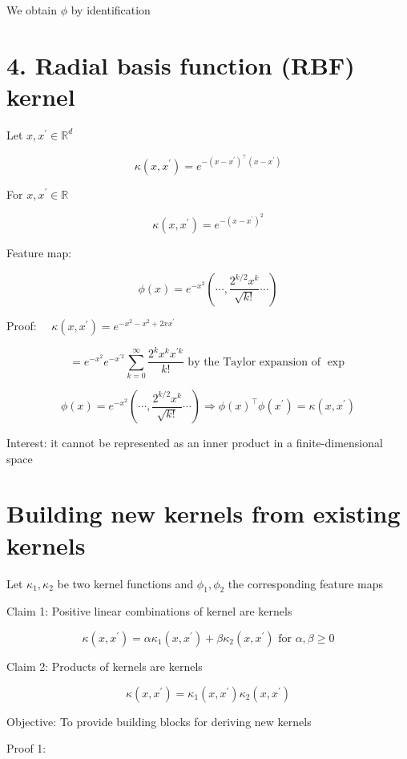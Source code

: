\documentclass[10pt]{article}
\begin{document}
We obtain $\phi$ by identification

\section*{4. Radial basis function (RBF) kernel}
Let $x, x^{\prime} \in \mathbb{R}^{d}$

$$
\kappa\left(x, x^{\prime}\right)=e^{-\left(x-x^{\prime}\right)^{\top}\left(x-x^{\prime}\right)}
$$

For $x, x^{\prime} \in \mathbb{R}$

$$
\kappa\left(x, x^{\prime}\right)=e^{-\left(x-x^{\prime}\right)^{2}}
$$

Feature map:

$$
\phi(x)=e^{-x^{2}}\left(\cdots, \frac{2^{k / 2} x^{k}}{\sqrt{k !}} \cdots\right)
$$

Proof: $\quad \kappa\left(x, x^{\prime}\right)=e^{-x^{2}-x^{2}+2 x x^{\prime}}$

$$
=e^{-x^{2}} e^{-x^{\prime 2}} \sum_{k=0}^{\infty} \frac{2^{k} x^{k} x^{\prime k}}{k !} \text { by the Taylor expansion of } \exp
$$

$$
\phi(x)=e^{-x^{2}}\left(\cdots, \frac{2^{k / 2} x^{k}}{\sqrt{k !}} \cdots\right) \Longrightarrow \phi(x)^{\top} \phi\left(x^{\prime}\right)=\kappa\left(x, x^{\prime}\right)
$$

Interest: it cannot be represented as an inner product in a finite-dimensional space

\section*{Building new kernels from existing kernels}
Let $\kappa_{1}, \kappa_{2}$ be two kernel functions and $\phi_{1}, \phi_{2}$ the corresponding feature maps

Claim 1: Positive linear combinations of kernel are kernels

$$
\kappa\left(x, x^{\prime}\right)=\alpha \kappa_{1}\left(x, x^{\prime}\right)+\beta \kappa_{2}\left(x, x^{\prime}\right) \text { for } \alpha, \beta \geq 0
$$

Claim 2: Products of kernels are kernels

$$
\kappa\left(x, x^{\prime}\right)=\kappa_{1}\left(x, x^{\prime}\right) \kappa_{2}\left(x, x^{\prime}\right)
$$

Objective: To provide building blocks for deriving new kernels

Proof 1:
\end{document}
